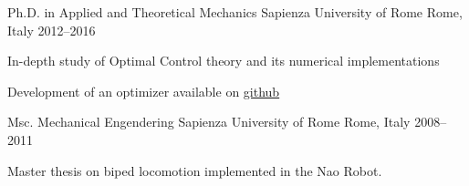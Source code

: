 \begin{cventries}
  \cventry
    {Ph.D. in Applied and Theoretical Mechanics} %
    {Sapienza University of Rome} %
    {Rome, Italy} %
    {2012--2016} %
    {
      \begin{cvitems} %
      \item {In-depth study of Optimal Control theory and its numerical  implementations}
      \item {Development of an optimizer available on \href{https://github.com/rafaelrojasmiliani/krotov_ch6}{github}}
      \end{cvitems}
    }
  \cventry
    {Msc. Mechanical Engendering} %
    {Sapienza University of Rome} %
    {Rome, Italy} %
    {2008--2011} %
    {
      \begin{cvitems} %
      \item {Master thesis on biped locomotion implemented in the Nao Robot.}
      \end{cvitems}
    }

\end{cventries}
